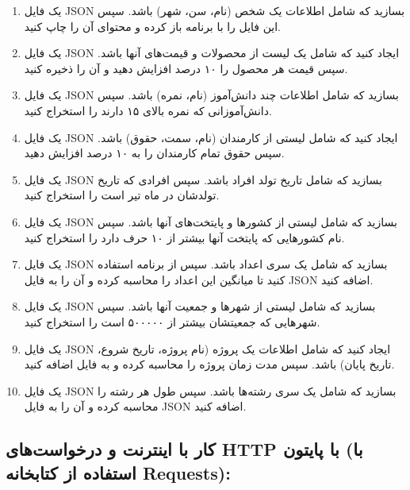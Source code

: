 \documentclass[a4paper,12pt]{article}
\begin{document}
	\begin{enumerate}
		\item یک فایل JSON بسازید که شامل اطلاعات یک شخص (نام، سن، شهر) باشد. سپس این فایل را با برنامه باز کرده و محتوای آن را چاپ کنید.
		\item یک فایل JSON ایجاد کنید که شامل یک لیست از محصولات و قیمت‌های آنها باشد. سپس قیمت هر محصول را ۱۰ درصد افزایش دهید و آن را ذخیره کنید.
		\item یک فایل JSON بسازید که شامل اطلاعات چند دانش‌آموز (نام، نمره) باشد. سپس دانش‌آموزانی که نمره بالای ۱۵ دارند را استخراج کنید.
		\item یک فایل JSON ایجاد کنید که شامل لیستی از کارمندان (نام، سمت، حقوق) باشد. سپس حقوق تمام کارمندان را به ۱۰ درصد افزایش دهید.
		\item یک فایل JSON بسازید که شامل تاریخ تولد افراد باشد. سپس افرادی که تاریخ تولدشان در ماه تیر است را استخراج کنید.
		\item یک فایل JSON بسازید که شامل لیستی از کشورها و پایتخت‌های آنها باشد. سپس نام کشورهایی که پایتخت آنها بیشتر از ۱۰ حرف دارد را استخراج کنید.
		\item یک فایل JSON بسازید که شامل یک سری اعداد باشد. سپس از برنامه استفاده کنید تا میانگین این اعداد را محاسبه کرده و آن را به فایل JSON اضافه کنید.
		\item یک فایل JSON بسازید که شامل لیستی از شهرها و جمعیت آنها باشد. سپس شهرهایی که جمعیتشان بیشتر از ۵۰۰۰۰۰ است را استخراج کنید.
		\item یک فایل JSON ایجاد کنید که شامل اطلاعات یک پروژه (نام پروژه، تاریخ شروع، تاریخ پایان) باشد. سپس مدت زمان پروژه را محاسبه کرده و به فایل اضافه کنید.
		\item یک فایل JSON بسازید که شامل یک سری رشته‌ها باشد. سپس طول هر رشته را محاسبه کرده و آن را به فایل JSON اضافه کنید.
	\end{enumerate}
	
	
	\subsection*{کار با اینترنت و درخواست‌های HTTP با پایتون (با استفاده از کتابخانه Requests):}
	
\end{document}

